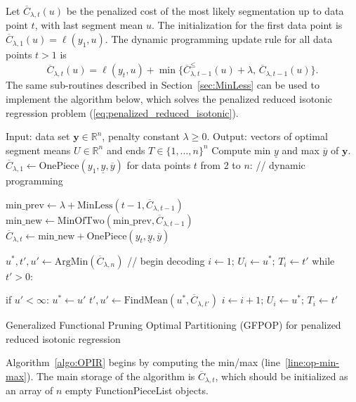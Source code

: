\documentclass[article]{jss}
\newcommand{\RR}{\mathbb R}
\begin{document}
Let $\overline C_{\lambda,t}(u)$ be the
penalized cost of the most likely segmentation up to data point $t$,
with last segment mean $u$. The initialization for the first data
point is $\overline C_{\lambda,1}(u) = \ell(y_1, u)$. The dynamic programming update rule
for all data points $t>1$ is
\begin{equation}
  \overline C_{\lambda,t}(u) = \ell(y_t, u) + \min\{
  \overline C_{\lambda,t-1}^\leq(u) + \lambda,\, \overline C_{\lambda,t-1}(u)
  \}.
\end{equation}
The same sub-routines described in Section~\ref{sec:MinLess} can be
used to implement the algorithm below, which solves the penalized
reduced isotonic regression problem
(\ref{eq:penalized_reduced_isotonic}).
\begin{algorithm}[H]
\begin{algorithmic}[1]
\STATE Input: data set $\mathbf y\in\RR^n$, penalty constant $\lambda\geq 0$.
\STATE Output: vectors of optimal segment means $U\in\RR^{n}$ and ends $T\in\{1,\dots,n\}^{n}$
\STATE Compute min $\underline y$ and max $\overline y$ of $\mathbf y$.
\label{line:op-min-max}
\STATE $\overline C_{\lambda,1}\gets \text{OnePiece}(y_1, \underline y, \overline y)$
\STATE for data points $t$ from 2 to $n$: // dynamic programming
\label{line:for-dp-t}
\begin{ALC@g}
  \STATE $\text{min\_prev}\gets \lambda + \text{MinLess}(t-1, \overline C_{\lambda,t-1})$
  \label{line:op-MinLess}
  \STATE $\text{min\_new}\gets \text{MinOfTwo}(\text{min\_prev}, \overline C_{\lambda, t-1})$
  \label{line:op-MinOfTwo}
  \STATE $\overline C_{\lambda,t}\gets \text{min\_new} + \text{OnePiece}(y_t, \underline y, \overline y)$
  \label{line:op-AddNew}
\end{ALC@g}
\STATE $u^*,t',u'\gets \text{ArgMin}(\overline C_{\lambda,n})$ // begin decoding
\label{line:op-ArgMin}
\STATE $i\gets 1;\, U_{i}\gets u^*;\, T_{i}\gets t'$
\label{line:op-store-i}
\STATE while $t' > 0$:
\begin{ALC@g}
  \STATE if $u' < \infty$: $u^*\gets u'$
  \STATE $t',u'\gets\text{FindMean}(u^*, \overline C_{\lambda,t'})$
  \STATE $i\gets i+1;\, U_{i}\gets u^*;\, T_{i}\gets t'$
\label{line:op-i+1}
\end{ALC@g}
\caption{\label{algo:OPIR}Generalized Functional Pruning Optimal
  Partitioning (GFPOP) for penalized reduced isotonic regression}
\end{algorithmic}
\end{algorithm}

Algorithm~\ref{algo:OPIR} begins by computing the min/max
(line~\ref{line:op-min-max}). The main storage
of the algorithm is $\overline C_{\lambda, t}$, which should be
initialized as an array of $n$ empty FunctionPieceList objects. 
\end{document}
